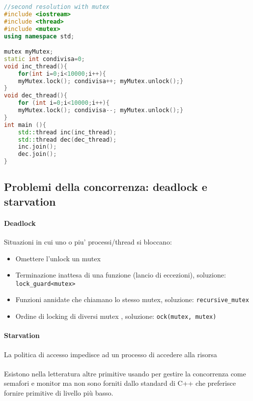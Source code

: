 \begin{lstlisting}[language=c++]
//second resolution with mutex 
#include <iostream> 
#include <thread>
#include <mutex>
using namespace std;

mutex myMutex;
static int condivisa=0;
void inc_thread(){
    for(int i=0;i<10000;i++){
    myMutex.lock(); condivisa++; myMutex.unlock();}
}
void dec_thread(){
    for (int i=0;i<10000;i++){
    myMutex.lock(); condivisa--; myMutex.unlock();}
}
int main (){
    std::thread inc(inc_thread);
    std::thread dec(dec_thread);
    inc.join();
    dec.join();
}
\end{lstlisting}


\subsection{Problemi della concorrenza: deadlock e starvation}

\paragraph{Deadlock}
Situazioni in cui uno o piu’ processi/thread si bloccano:
\begin{itemize}
    \item Omettere l’unlock un mutex
    \item Terminazione inattesa di una funzione (lancio di eccezioni), soluzione: \verb|lock_guard<mutex>|
    \item Funzioni annidate che chiamano lo stesso mutex, soluzione: \verb|recursive_mutex|
    \item Ordine di locking di diversi mutex , soluzione: \verb|ock(mutex, mutex)|
\end{itemize}

\paragraph{Starvation} 
La politica di accesso impedisce ad un processo di accedere alla risorsa

\paragraph{}
Esistono nella letteratura altre primitive usando per
gestire la concorrenza come semafori e monitor ma non sono forniti dallo standard di C++ che
preferisce fornire primitive di livello più basso.